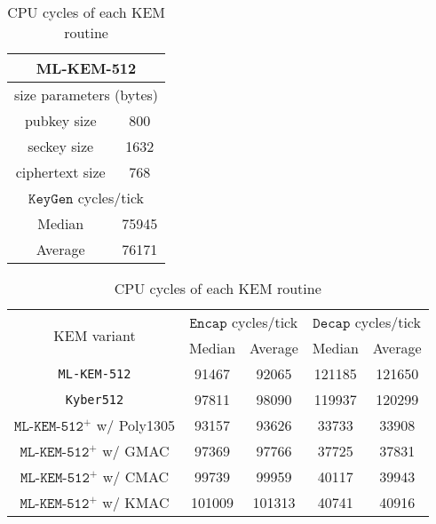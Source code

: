 \documentclass[journal=tches,submission]{iacrtrans}
\newcommand{\keygen}{\texttt{KeyGen}}
\newcommand{\encap}{\texttt{Encap}}
\newcommand{\decap}{\texttt{Decap}}
\begin{document}
\begin{table}[h]
    \centering
    \footnotesize
    \caption{CPU cycles of each KEM routine}\label{tbl:kem-performance}

    \begin{tabular}[t]{|cc|}
        \hline
        \multicolumn{2}{|c|}{\bf ML-KEM-512} \\
        \hline
        \multicolumn{2}{|c|}{size parameters (bytes)} \\
        pubkey size & 800 \\
        seckey size & 1632 \\
        ciphertext size & 768 \\
        \hline
        \multicolumn{2}{|c|}{$\keygen$ cycles/tick} \\
        Median & 75945 \\
        Average & 76171 \\
        \hline
    \end{tabular}
    \begin{tabular}[t]{|c|c|c|c|c|}
        \hline
        \multirow{2}{*}{KEM variant} 
        & \multicolumn{2}{|c|}{$\encap$ cycles/tick} 
        & \multicolumn{2}{|c|}{$\decap$ cycles/tick} \\
        \cline{2-5}
        & Median & Average & Median & Average \\
        \hline
        \texttt{ML-KEM-512} & 91467 & 92065 & 121185 & 121650 \\
        \hline
        \texttt{Kyber512} & 97811 & 98090 & 119937 & 120299 \\
        \hline
        $\texttt{ML-KEM-512}^+$ w/ Poly1305 & 93157 & 93626 & 33733 & 33908 \\
        \hline
        $\texttt{ML-KEM-512}^+$ w/ GMAC & 97369 & 97766 & 37725 & 37831 \\
        \hline
        $\texttt{ML-KEM-512}^+$ w/ CMAC & 99739 & 99959 & 40117 & 39943 \\
        \hline
        $\texttt{ML-KEM-512}^+$ w/ KMAC & 101009 & 101313 & 40741 & 40916 \\
        \hline
    \end{tabular}\vspace{0.3cm}


\end{table}
\end{document}
